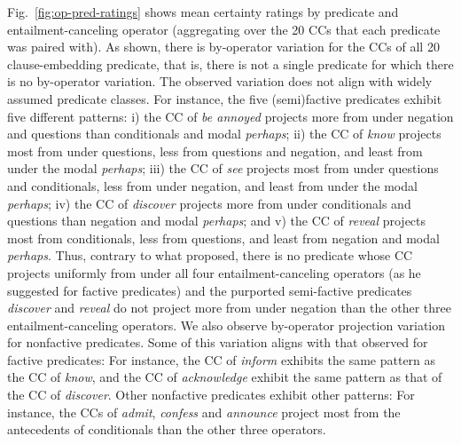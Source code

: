 \documentclass[a4paper,12pt,twoside]{article}
\begin{document}
  Fig.~\ref{fig:op-pred-ratings} shows mean certainty ratings by predicate and entailment-canceling operator (aggregating over the 20 CCs that each predicate was paired with). As shown, there is by-operator variation for the CCs of all 20 clause-embedding predicate, that is, there is not a single predicate for which there is no by-operator variation. The observed variation does not align with widely assumed predicate classes. For instance, the five (semi)factive predicates exhibit five different patterns: 
i) the CC of \emph{be annoyed} projects more from under negation and questions than conditionals and modal {\em perhaps}; ii) the CC of \emph{know} projects most from under questions, less from questions and negation, and least from under the modal {\em perhaps}; iii) the CC of \emph{see} projects most from under questions and conditionals, less from under negation, and least from under the modal \emph{perhaps}; iv) the CC of  \emph{discover} projects more from under conditionals and questions than negation and modal {\em perhaps}; and v) the CC of \emph{reveal} projects most from conditionals, less from questions, and least from negation and modal \emph{perhaps}. Thus, contrary to what \citealt{karttunen_observations_1971} proposed, there is no predicate whose CC projects uniformly from under all four entailment-canceling operators (as he suggested for factive predicates) and the purported semi-factive predicates  \emph{discover} and \emph{reveal} do not project more from under negation than the other three entailment-canceling operators. We also observe by-operator projection variation for nonfactive predicates. Some of this variation aligns with that observed for factive predicates: For instance, the CC of \emph{inform} exhibits the same pattern as the CC of \emph{know}, and the CC of \emph{acknowledge} exhibit the same pattern as that of the CC of \emph{discover}. Other nonfactive predicates exhibit other patterns: For instance, the CCs of \emph{admit}, \emph{confess} and \emph{announce} project most from the antecedents of conditionals than the other three operators. 
\end{document}
